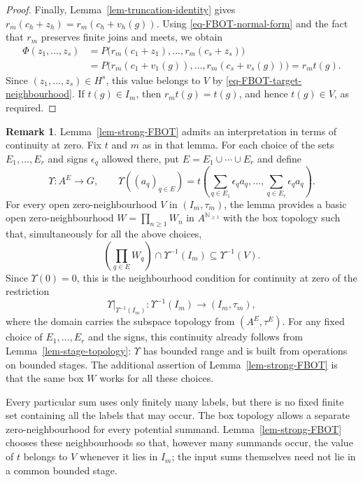 \documentclass[preprint,3p]{elsarticle}
\theoremstyle{plain}
\theoremstyle{definition}
\newtheorem{rem}[thm]{Remark}
\numberwithin{equation}{section}
\begin{document}
\begin{proof}
Finally, Lemma~\ref{lem-truncation-identity} gives
$r_m(c_h+z_h)=r_m(c_h+v_h(g))$.
Using \eqref{eq-FBOT-normal-form} and the fact that $r_m$
preserves finite joins and meets, we obtain
\[
\begin{aligned}
 \Phi(z_1,\ldots,z_s)
 &=P\bigl(r_m(c_1+z_1),\ldots,r_m(c_s+z_s)\bigr)\\
 &=P\bigl(r_m(c_1+v_1(g)),\ldots,r_m(c_s+v_s(g))\bigr)
 =r_mt(g).
\end{aligned}
\]
Since $(z_1,\ldots,z_s)\in H^s$, this value belongs to $V$ by
\eqref{eq-FBOT-target-neighbourhood}.
If $t(g)\in I_m$, then $r_mt(g)=t(g)$, and hence $t(g)\in V$,
as required.
\end{proof}

\begin{rem}
\label{rem-FBOT-box-continuity}
Lemma~\ref{lem-strong-FBOT} admits an interpretation in terms of
continuity at zero.  Fix $t$ and $m$ as in that lemma.
For each choice of the sets $E_1,\ldots,E_r$ and signs
$\epsilon_q$ allowed there, put $E=E_1\cup\cdots\cup E_r$
and define
\[
 \Upsilon\colon A^E\longrightarrow G,
 \qquad
 \Upsilon((a_q)_{q\in E})
 =t\left(\sum_{q\in E_1}\epsilon_q a_q,\ldots,
          \sum_{q\in E_r}\epsilon_q a_q\right).
\]
For every open zero-neighbourhood $V$ in $(I_m,\tau_m)$, the lemma
provides a basic open zero-neighbourhood
$W=\prod_{n\geq1}W_n$ in $A^{\mathbb N_{\geq1}}$ with the box topology
such that, simultaneously for all the above choices,
\[
 \left(\prod_{q\in E}W_q\right)\cap\Upsilon^{-1}(I_m)
 \subseteq\Upsilon^{-1}(V).
\]
Since $\Upsilon(0)=0$, this is the neighbourhood condition for continuity
at zero of the restriction
\[
 \left.\Upsilon\right|_{\Upsilon^{-1}(I_m)}\colon
 \Upsilon^{-1}(I_m)\longrightarrow(I_m,\tau_m),
\]
where the domain
carries the subspace topology from $(A^E,\tau^E)$.
For any fixed choice of $E_1,\ldots,E_r$ and the signs, this
continuity already follows from Lemma~\ref{lem-stage-topology}:
$\Upsilon$ has bounded range and is built from operations on bounded stages.
The additional assertion of Lemma~\ref{lem-strong-FBOT} is that the
same box $W$ works for all these choices.

Every particular sum uses only finitely many labels, but there is
no fixed finite set containing all the labels that may occur.
The box topology allows a separate zero-neighbourhood for every
potential summand.  Lemma~\ref{lem-strong-FBOT} chooses these
neighbourhoods so that, however many summands occur, the value of
$t$ belongs to $V$ whenever it lies in $I_m$; the input sums
themselves need not lie in a common bounded stage.
\end{rem}
\end{document}
